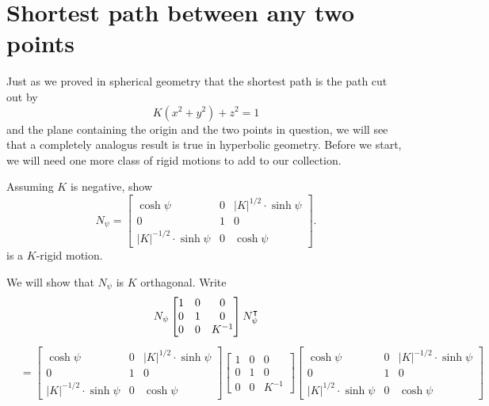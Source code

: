 \documentclass{ximera}
\begin{document}
\section{Shortest path between any two points}

Just as we proved in spherical geometry that the shortest path is the
path cut out by
\[
K\left(  x^{2}+y^{2}\right)  +z^{2}=1
\]
and the plane containing the origin and the two points in question, we
will see that a completely analogus result is true in hyperbolic
geometry. Before we start, we will need one more class of rigid
motions to add to our collection.


\begin{problem}
  Assuming $K$ is negative, show
  \[
  N_\psi=
  \begin{bmatrix}
    \cosh\psi & 0 & |K|^{1/2}\cdot\sinh\psi\\
    0 & 1 & 0\\
    |K|^{-1/2}\cdot\sinh\psi & 0 & \cosh\psi
  \end{bmatrix}.
  \]
  is a $K$-rigid motion.
  \begin{freeResponse}
    We will show that $N_\psi$ is $K$ orthagonal. Write
    \[
    N_\psi
      \begin{bmatrix}
        1 & 0 & 0 \\
        0 & 1 & 0 \\
        0 & 0 & K^{-1}
      \end{bmatrix}
      N_\psi^\intercal
    \]
    \begin{align*}
  &=
      \begin{bmatrix}
    \cosh\psi & 0 & |K|^{1/2}\cdot\sinh\psi\\
    0 & 1 & 0\\
    |K|^{-1/2}\cdot\sinh\psi & 0 & \cosh\psi
      \end{bmatrix}
      \begin{bmatrix}
        1 & 0 & 0 \\
        0 & 1 & 0 \\
        0 & 0 & K^{-1}
      \end{bmatrix}
 \begin{bmatrix}
    \cosh\psi & 0 & |K|^{-1/2}\cdot\sinh\psi\\
    0 & 1 & 0\\
    |K|^{1/2}\cdot\sinh\psi & 0 & \cosh\psi
 \end{bmatrix} \\

\end{align*}
\end{freeResponse}
\end{problem}
\end{document}
